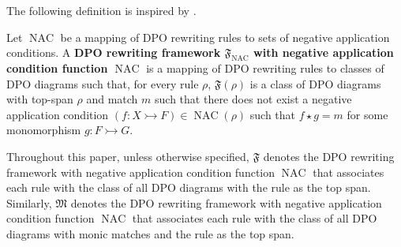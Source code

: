 The following definition is inspired by \cite{endrullis2024generalized}.
\begin{definition}
    Let $\operatorname{NAC}$ be a mapping of DPO rewriting rules to sets of negative application conditions.
    A \textbf{DPO rewriting framework $\mathfrak{F}_{\operatorname{NAC}}$ with negative application condition function $\operatorname{NAC}$} is a mapping of DPO rewriting rules to classes of DPO diagrams such that, for every rule $\rho$, $\mathfrak{F}(\rho)$ is a class of DPO diagrams with top-span $\rho$ and match $m$ such that there does not exist a negative application condition $(f:X \rightarrowtail F) \mathop{\in} \operatorname{NAC}(\rho)$ such that $f \mathop{\star} g \mathop{=} m$ for some monomorphism $g: F \rightarrowtail G$.
\end{definition}
Throughout this paper, unless otherwise specified, 
\(\mathfrak{F}\) denotes the DPO rewriting framework with negative application condition function $\operatorname{NAC}$ that associates each rule with the class of all DPO diagrams with the rule as the top span. Similarly, \(\mathfrak{M}\) denotes the DPO rewriting framework with negative application condition function $\operatorname{NAC}$ that associates each rule with the class of all DPO diagrams with monic matches and the rule as the top span.